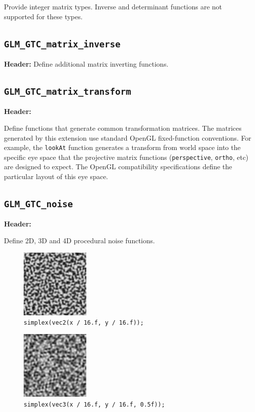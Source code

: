 \documentclass{scrartcl}
\numberwithin{figure}{subsection}
\begin{document}
Provide integer matrix types. Inverse and determinant functions are not supported for these types.

\subsection{\texttt{GLM\_GTC\_matrix\_inverse}}
\textbf{Header:} 
Define additional matrix inverting functions. 

\subsection{\texttt{GLM\_GTC\_matrix\_transform}}
\textbf{Header:} 

Define functions that generate common transformation matrices.
The matrices generated by this extension use standard OpenGL fixed-function conventions. For example, the \verb|lookAt| function generates a transform from world space into the specific eye space that the projective matrix functions (\verb|perspective|, \verb|ortho|, etc) are designed to expect. The OpenGL compatibility specifications define the particular layout of this eye space.

\subsection{\texttt{GLM\_GTC\_noise}}
\textbf{Header:} 

Define 2D, 3D and 4D procedural noise functions.

\begin{figure}
  \centering
  \includegraphics[width=0.3\textwidth]{simplex1}
  \cprotect\caption{\verb|simplex(vec2(x / 16.f, y / 16.f));|}
\end{figure}

\begin{figure}
  \centering
  \includegraphics[width=0.3\textwidth]{simplex2}
  \cprotect\caption{\verb|simplex(vec3(x / 16.f, y / 16.f, 0.5f));|}
\end{figure}
\end{document}
